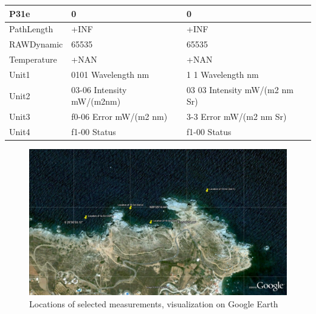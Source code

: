 \documentclass[10pt, a4paper]{article}
\begin{document}
\begin{appendices}
\begin{table}[H]
\begin{tabular}{| p{3cm} | p{3cm} | p{5cm} |}
   P31e & 0 & 0 \\ \hline
   PathLength & +INF & +INF \\ \hline
   RAWDynamic & 65535 & 65535 \\ \hline
   Temperature & +NAN & +NAN \\ \hline
   Unit1 & 0101 Wavelength nm &  1 1 Wavelength nm \\ \hline
   Unit2 & 03-06 Intensity mW/(m2nm) & 03 03 Intensity mW/(m2 nm Sr) \\ \hline
   Unit3 & f0-06 Error mW/(m2 nm) & 3-3 Error mW/(m2 nm Sr) \\ \hline
  Unit4 & f1-00 Status & f1-00 Status \\ \hline
  \end{tabular}
\end{table}
\pagebreak

\begin{figure}[H]
\begin{center}
\includegraphics[scale=0.20]{Locations_Meas.jpg}
\caption{Locations of selected measurements, visualization on Google Earth­}
\label{fig:59}
\end{center}
\end{figure}


\end{appendices}
\end{document}
